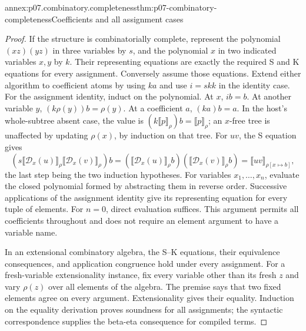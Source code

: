 \begin{annexitem}{annex:p07.combinatory.completeness}{thm:p07-combinatory-completeness}{Coefficients and all assignment cases}
\begin{proof}
If the structure is combinatorially complete, represent the polynomial
\((xz)(yz)\) in three variables by \(s\), and the polynomial \(x\) in two
indicated variables \(x,y\) by \(k\).  Their representing equations are
exactly the required S and K equations for every assignment.
Conversely assume those equations.  Extend either algorithm to coefficient
atoms by using \(ka\) and use \(i=skk\) in the identity case.
For the assignment identity, induct on the polynomial.  At \(x\), \(ib=b\).
At another variable \(y\), \((k\rho(y))b=\rho(y)\).  At a coefficient \(a\),
\((ka)b=a\).  In the host's whole-subtree absent case, the value is
\((k\llbracket p\rrbracket_\rho)b=\llbracket p\rrbracket_\rho\);
an \(x\)-free tree is unaffected by updating \(\rho(x)\), by induction on
that tree.  For \(uv\), the S equation gives
\[
 (s\llbracket\mathcal D_x(u)\rrbracket_\rho
    \llbracket\mathcal D_x(v)\rrbracket_\rho)b
 = (\llbracket\mathcal D_x(u)\rrbracket_\rho b)
   (\llbracket\mathcal D_x(v)\rrbracket_\rho b)
 =\llbracket uv\rrbracket_{\rho[x\mapsto b]},
\]
the last step being the two induction hypotheses.
For variables \(x_1,\ldots,x_n\), evaluate the closed polynomial formed by
abstracting them in reverse order.  Successive applications of the assignment
identity give its representing equation for every tuple of elements.
For \(n=0\), direct evaluation suffices.  This argument permits all coefficients
throughout and does not require an element argument to have a variable name.

In an extensional combinatory algebra, the S--K equations, their equivalence
consequences, and application congruence hold under every assignment.  For a
fresh-variable extensionality instance, fix every variable other than its
fresh \(z\) and vary \(\rho(z)\) over all elements of the algebra.
The premise says that two fixed elements agree on every argument.
Extensionality gives their equality.  Induction on the equality derivation
proves soundness for all assignments; the syntactic correspondence supplies
the beta-eta consequence for compiled terms.
\end{proof}
\end{annexitem}

